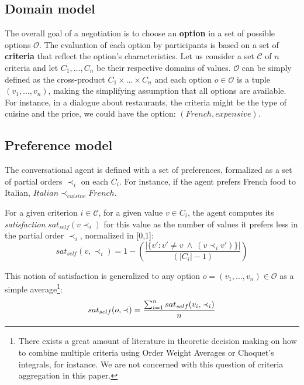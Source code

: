 \documentclass{llncs}
\begin{document}
	\subsection{Domain model}
	The overall goal of a negotiation is to choose an \textbf{option} in a set of possible options $\mathcal{O}$. The evaluation of each option by participants is based on a set of \textbf{criteria} that reflect the option's characteristics. Let us consider a set $\mathcal{C}$ of $n$ criteria and let $C_1,\ldots,C_n$ be their respective domains of values. $\mathcal{O}$ can be simply defined as the cross-product $C_1\times\ldots\times C_n$ and each option $o\in\mathcal{O}$ is a tuple $(v_1,\ldots,v_n)$, making the simplifying assumption that all options are available. For instance, in a dialogue about restaurants, the criteria might be the type of cuisine and the price, we could have the option: $(French,expensive)$.
	
	\subsection{Preference model} 
	The conversational agent is defined with a set of preferences, formalized as a set of partial orders $\prec_i$ on each $C_i$. For instance, if the agent prefers French food to Italian, $Italian\prec_{cuisine}French$.
	
	For a given criterion $i\in \mathcal{C}$, for a given value $v\in C_i$, the agent computes its \emph{satisfaction} $sat_{self}(v \prec_i)$ for this value as the number of values it prefers less in the partial order $\prec_i$, normalized in [0,1]:
	\vspace{-.5em} 
	\begin{equation}
	sat_{self}(v, \prec_i) =	1 - \left( \frac{|\{v' : v' \neq v \  \wedge \ (v \prec_i v')\}| }{( |C_i| - 1 )}\right)
	\end{equation}
	
	This notion of satisfaction is generalized to any option $o= (v_1, \ldots, v_n)\in \mathcal{O}$ as a simple average\footnote{There exists a great amount of literature in theoretic decision making on how to combine multiple criteria using Order Weight Averages or Choquet's integrals, for instance. We are not concerned with this question of criteria aggregation in this paper.}:
	\vspace{-1em} 
	\begin{equation}
	sat_{self}(o, \prec) = \frac{\sum_{i=1}^{n} sat_{self}(v_i, \prec_i) }{n}
	\vspace{-1.5em} 
	\end{equation}
	
\end{document}
